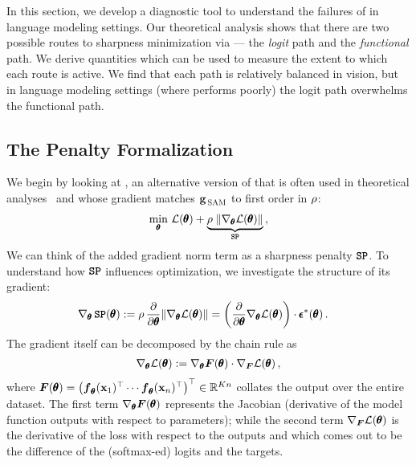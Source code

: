 In this section, we develop a diagnostic tool to understand the failures of \SAM in language modeling settings. Our theoretical analysis shows
that there are two possible routes to sharpness minimization via \SAM --- the \emph{logit} path and the \emph{functional} path.
We derive quantities which can be used to measure the extent to which each route is active.
We find that each path is relatively balanced in vision, but in language modeling settings (where \SAM performs poorly) the logit path overwhelms 
the functional path.

\subsection{The Penalty Formalization}

We begin by looking at \penaltySAM, an alternative version of \SAM that is often used in 
theoretical analyses~\citep{andriushchenko2022understandingsharpnessawareminimization,dauphin2024neglected} and whose gradient matches ${\boldsymbol{\mathbf{g}}}_{\, {\textcolor{black}{\textsc{SAM}}}}$ to first order in
$\rho$:
\begin{align}\label{eq:pen-sam}
    \min_{\pmb \theta}\, {\mathcal{L}}({\pmb \theta}) + \textcolor{black}{\underbrace{\rho \;\|\nabla_{\pmb \theta} {\mathcal{L}}({\pmb \theta})\|}_{\textcolor{black}{\textbf{\texttt{SP}}}}}\,,
\end{align}
We can think of the added gradient norm term as a sharpness penalty $\textcolor{black}{\textbf{\texttt{SP}}}$. To understand how $\textcolor{black}{\textbf{\texttt{SP}}}$ influences optimization, we investigate the structure of its gradient:
\begin{align}\label{eq:gradnorm-grad}
\textcolor{black}{\nabla_{\pmb \theta} \, \textbf{\texttt{SP}}({\pmb \theta})}:=\rho \, \frac{\partial }{\partial{\pmb \theta}} \|\nabla_{\pmb \theta} {\mathcal{L}}({\pmb \theta})\|&=   \left(\frac{\partial }{\partial{\pmb \theta}}\nabla_{\pmb \theta} {\mathcal{L}}({\pmb \theta})\right) \cdot {\pmb \epsilon}^\ast({\pmb \theta})
\,.
\end{align}
The gradient itself can be decomposed by the chain rule as
\begin{align}
    \nabla_{\pmb \theta} {\mathcal{L}}({\pmb \theta}) :=  \nabla_{\pmb \theta} \boldsymbol{F}({\pmb \theta}) \cdot \nabla_{\boldsymbol{F}} {\mathcal{L}}({\pmb \theta})\,,
\end{align} where $\boldsymbol{F}({\pmb \theta}) = \begin{pmatrix} \boldsymbol{f}_{\pmb \theta}(\mathbf x_1)^\top \cdots \boldsymbol{f}_{\pmb \theta}(\mathbf x_n)^\top\end{pmatrix}^\top \in {\mathbb{R}^{Kn}}$ collates the output over the entire dataset.
The first term $\nabla_{\pmb \theta} \boldsymbol{F}({\pmb \theta})$ represents the Jacobian (derivative of the model function outputs with
respect to parameters); while the second term $\nabla_{\boldsymbol{F}} {\mathcal{L}}({\pmb \theta})$ is the derivative of the loss with respect to the outputs and which comes out to be the difference of the (softmax-ed) logits and the targets.

